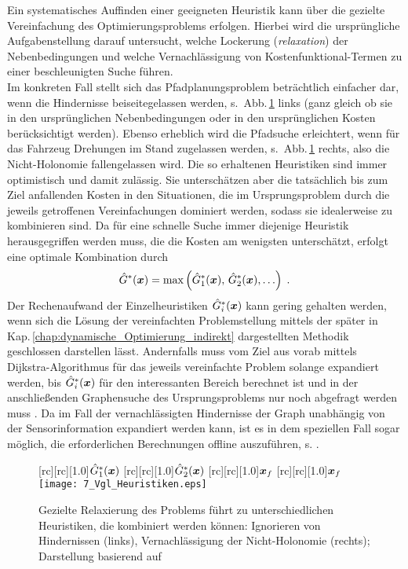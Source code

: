{Ein systematisches Auffinden einer geeigneten Heuristik kann über die gezielte Vereinfachung des Optimierungsproblems erfolgen. Hierbei wird die ursprüngliche Aufgabenstellung darauf untersucht, welche Lockerung (\emph{relaxation}) der Nebenbedingungen und welche Vernachlässigung von Kostenfunktional-Termen zu einer beschleunigten Suche führen. \\
Im konkreten Fall stellt sich das Pfadplanungsproblem beträchtlich einfacher dar, wenn die Hindernisse beiseitegelassen werden, s.\ Abb.\,\ref{fig:heuristics} links (ganz gleich ob sie in den ursprünglichen Nebenbedingungen oder in den ursprünglichen Kosten berücksichtigt werden). Ebenso erheblich wird die Pfadsuche erleichtert, wenn für das Fahrzeug Drehungen im Stand zugelassen werden, s.\ Abb.\,\ref{fig:heuristics} rechts, also die Nicht-Holonomie fallengelassen wird. Die so erhaltenen Heuristiken sind immer optimistisch und damit zulässig. Sie unterschätzen aber die tatsächlich bis zum Ziel anfallenden Kosten in den Situationen, die im Ursprungsproblem durch die jeweils getroffenen Vereinfachungen dominiert werden, sodass sie idealerweise zu kombinieren sind. Da für eine schnelle Suche immer diejenige Heuristik herausgegriffen werden muss, die die Kosten am wenigsten unterschätzt, erfolgt eine optimale Kombination durch  
\begin{align*}
		\hat G^\ast(\boldsymbol{x}) = \max\left( \hat G_1^\ast(\boldsymbol{x}), \, \hat G_2^\ast(\boldsymbol{x}), \ldots \right) \; .
\end{align*}
Der Rechenaufwand der Einzelheuristiken  $\hat G_i^\ast(\boldsymbol{x})$ kann gering gehalten werden, wenn sich die Lösung der vereinfachten Problemstellung mittels der später in Kap.\,\ref{chap:dynamische_Optimierung_indirekt} dargestellten Methodik geschlossen darstellen lässt. Andernfalls muss vom Ziel aus vorab mittels Dijkstra-Algorithmus für das jeweils vereinfachte Problem solange expandiert werden, bis $\hat G^\ast_i(\boldsymbol{x})$ für den interessanten Bereich berechnet ist und in der anschließenden Graphensuche des Ursprungsproblems nur noch abgefragt werden muss \cite{dolgov2010path,likhachev2009planning}. Da im Fall der vernachlässigten Hindernisse der Graph unabhängig von der Sensorinformation expandiert werden kann, ist es in dem speziellen Fall sogar möglich, die erforderlichen Berechnungen offline auszuführen, s. \zB \cite{knepper2006high}.
 
\begin{figure}[h]
\centering
{}[rc][rc][1.0]{$\hat {G}^\ast_1(\boldsymbol{x})$}
[rc][rc][1.0]{$\hat {G}^\ast_2(\boldsymbol{x})$}
[rc][rc][1.0]{$\boldsymbol{x}_f$}
[rc][rc][1.0]{$\boldsymbol{x}_f$}
 \texttt{[image: 7\_Vgl\_Heuristiken.eps]}
	\caption[Gezielte Problemrelaxierung]{Gezielte Relaxierung des Problems führt zu unterschiedlichen Heuristiken, die kombiniert werden können: Ignorieren von Hindernissen (links), Vernachlässigung der Nicht-Holonomie (rechts); Darstellung basierend auf \cite{likhachev2009planning}}
	\label{fig:heuristics}
\end{figure} 

}
